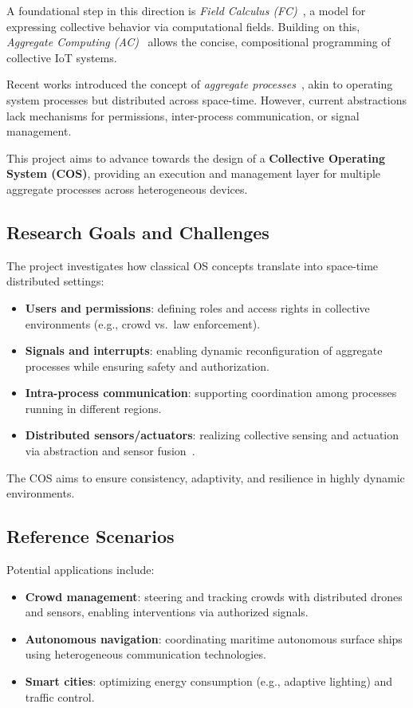 \documentclass[runningheads]{llncs}
\begin{document}
    A foundational step in this direction is \emph{Field Calculus (FC)}~\cite{JLAMP2019,TOCL2019}, a model for expressing collective behavior via computational fields.
    Building on this, \emph{Aggregate Computing (AC)}~\cite{BealIEEEComputer2015} allows the concise, compositional programming of collective IoT systems.

    Recent works introduced the concept of \emph{aggregate processes}~\cite{EAAI2020-processes}, akin to operating system processes but distributed across space-time. However, current abstractions lack mechanisms for permissions, inter-process communication, or signal management.

    This project aims to advance towards the design of a \textbf{Collective Operating System (COS)}, providing an execution and management layer for multiple aggregate processes across heterogeneous devices.

    \subsection{Research Goals and Challenges}
    The project investigates how classical OS concepts translate into space-time distributed settings:
    \begin{itemize}
        \item \textbf{Users and permissions}: defining roles and access rights in collective environments (e.g., crowd vs.\ law enforcement).
        \item \textbf{Signals and interrupts}: enabling dynamic reconfiguration of aggregate processes while ensuring safety and authorization.
        \item \textbf{Intra-process communication}: supporting coordination among processes running in different regions.
        \item \textbf{Distributed sensors/actuators}: realizing collective sensing and actuation via abstraction and sensor fusion~\cite{DBLP:journals/arc/Sasiadek02}.
    \end{itemize}
    The COS aims to ensure consistency, adaptivity, and resilience in highly dynamic environments.

    \subsection{Reference Scenarios}
    Potential applications include:
    \begin{itemize}
        \item \textbf{Crowd management}: steering and tracking crowds with distributed drones and sensors, enabling interventions via authorized signals.
        \item \textbf{Autonomous navigation}: coordinating maritime autonomous surface ships using heterogeneous communication technologies.
        \item \textbf{Smart cities}: optimizing energy consumption (e.g., adaptive lighting) and traffic control.
    \end{itemize}
\end{document}
